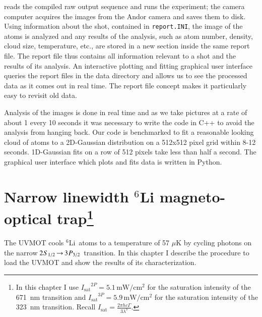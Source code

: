 \documentclass[oneside,12pt]{memoir}
\newcommand{\twos}[1]{\ensuremath{\hspace{-1pt}2\hspace{0.5pt}\hspace{0pt}S_{#1}\hspace{-1pt}}}
\newcommand{\trep}[1]{\ensuremath{\hspace{-1pt}3\hspace{0.5pt}\hspace{0pt}P_{#1}\hspace{-1pt}}}
\newcommand{\uv}{\ensuremath{ \twos{1/2}\hspace{-0.0pt}\rightarrow\hspace{-0.0pt}\trep{3/2} }\ }
\newcommand{\isat}{ \ensuremath{ I_{\mathrm{sat}} } }
\newcommand{\li} {\ensuremath{^{6}}Li\ }
\begin{document}
reads the compiled raw output sequence and runs the experiment; the camera
computer acquires the images from the Andor camera and saves them to disk.
Using information about the shot, contained in \verb$report.INI$, the image of
the atoms is analyzed and any results of the analysis, such as atom number,
density, cloud size, temperature, etc., are stored in a new section inside the
same report file.   The report file thus contains all information relevant to a
shot and the results of its analysis.  An interactive plotting and fitting
graphical user interface queries the report files in the data directory and
allows us to see the processed data as it comes out in real time.   The report
file concept makes it particularly easy to revisit old data. 

Analysis of the images is done in real time and as we take pictures at a rate
of about 1 every 10 seconds it was necessary to write the code in C++ to avoid
the analysis from hanging back.  Our code is benchmarked to fit a reasonable
looking cloud of atoms to a 2D-Gaussian distribution on a 512x512 pixel grid
within 8-12 seconds. 1D-Gaussian fits on a row of 512 pixels take less than
half a second.   The graphical user interface which plots and fits data is
written in Python. 




\chapter[Narrow linewidth $^{6}$Li magneto-optical trap]{Narrow linewidth
$^{6}$Li magneto-optical trap\footnote{In this chapter I use
$\isat^{2P}=5.1\,\mathrm{mW/cm^{2}}$ for the saturation intensity of the 671~nm
transition and $\isat^{3P}=5.9\,\mathrm{mW/cm^{2}}$ for the saturation
intensity of the 323~nm transition.  Recall $\isat= \frac{2\pi h
c\Gamma}{3\lambda^{3}}$.}} \label{ch:uvmot}

The UVMOT  cools \li atoms to a temperature of 57 $\mu$K by cycling photons on
the narrow \uv transition.   In this chapter I describe the procedure to load
the UVMOT and show the results of its characterization.  

\end{document}
